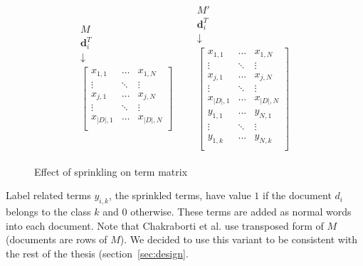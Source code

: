 \begin{figure}[h]
\centering
    \begin{equation*}
\begin{matrix} 
\begin{matrix} 
M  \\
\textbf{d}_i^T  \\
\downarrow \\
\begin{bmatrix}
x_{1,1}& \dots&  x_{1,N} \\
\vdots &  \ddots & \vdots \\
x_{j,1}& \dots & x_{j,N} \\
\vdots & \ddots & \vdots \\
x_{|D|,1} &\dots&  x_{|D|,N} \\
\end{bmatrix}
\end{matrix}
&
&
\begin{matrix} 
M'  \\
\textbf{d}_i^T  \\
\downarrow \\
\begin{bmatrix}
x_{1,1}& \dots&  x_{1,N} \\
\vdots &  \ddots & \vdots \\
x_{j,1}& \dots & x_{j,N} \\
\vdots & \ddots & \vdots \\
x_{|D|,1} &\dots&  x_{|D|,N} \\
\hline 
y_{1,1} &\dots&  y_{N,1} \\
\vdots & \ddots & \vdots \\
y_{1,k} &\dots&  y_{N,k} \\

\end{bmatrix}
\end{matrix}
\end{matrix}
\end{equation*}

\caption{Effect of sprinkling on term matrix}
\end{figure}

    Label related terms $y_{i,k}$, the sprinkled terms, have value $1$ if the document $d_i$ belongs to the class $k$ and $0$ otherwise.
    These terms are added as normal words into each document.
    Note that Chakraborti et al. use transposed form of $M$ (documents are rows of $M$).
    We decided to use this variant to be consistent with the rest of the thesis (section~\ref{sec:design}.
    
